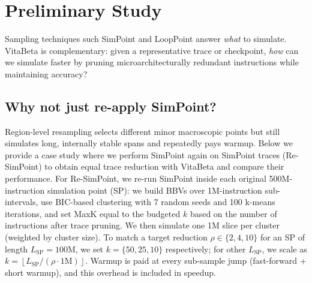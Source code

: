 \documentclass[conference]{IEEEtran}
\newcommand{\name}{VitaBeta }
\begin{document}


\section{Preliminary Study}
Sampling techniques such SimPoint and LoopPoint answer \emph{what} to simulate. VitaBeta is complementary: given a representative trace or checkpoint, \emph{how} can we simulate faster by pruning microarchitecturally redundant instructions while maintaining accuracy?

\subsection*{Why not just re-apply SimPoint?}
Region-level resampling selects different minor macroscopic points but still simulates long, internally stable spans and repeatedly pays warmup. Below we provide a case study where we perform SimPoint again on SimPoint traces (Re-SimPoint) to obtain equal trace reduction with \name and compare their performance. For Re-SimPoint, we re-run SimPoint inside each original 500M-instruction simulation point (SP): we build BBVs over 1M-instruction sub-intervals, use BIC-based clustering with 7 random seeds and 100 k-means iterations, and set MaxK equal to the budgeted $k$ based on the number of instructions after trace pruning. We then simulate one 1M slice per cluster (weighted by cluster size). To match a target reduction $\rho\!\in\!\{2,4,10\}$ for an SP of length $L_{\text{SP}}{=}100$M, we set $k{=}\{50,25,10\}$ respectively; for other $L_{\text{SP}}$, we scale as $k=\left\lfloor L_{\text{SP}}/(\rho\cdot 1\text{M})\right\rfloor$. Warmup is paid at every sub-sample jump (fast-forward + short warmup), and this overhead is included in speedup.
 
\end{document}
